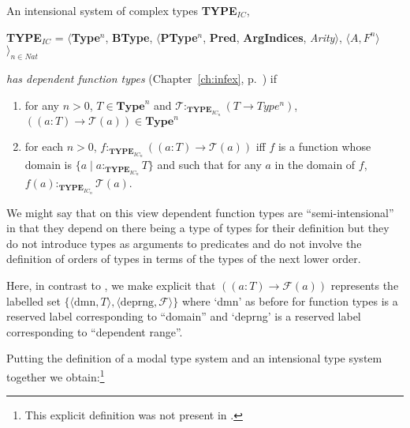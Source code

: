 \label{pg:dep-fn-types}An intensional system of complex types \textbf{TYPE}$_\mathit{IC}$,
\begin{display}
{\bf TYPE$_\mathit{IC}$} = $\langle${\bf Type}$^n$, {\bf BType},
$\langle$\textbf{PType}$^n$, {\bf Pred}, \textbf{ArgIndices}, {\it
  Arity\/}$\rangle$, $\langle A,F^n\rangle$$\rangle_{n\in\mathit{Nat}}$
\end{display} 
\textit{has dependent function types} (Chapter~\ref{ch:infex},
p.~\pageref{ex:dep-fun-types}) if
\begin{enumerate} 
 
\item for any $n>0$, $T \in \mathbf{Type}^n$ and
  $\mathcal{T}:_{\mathbf{TYPE}_{\mathit{IC}_n}}(T\rightarrow\mathit{Type^n})$,
  $((a:T)\rightarrow \mathcal{T}(a)) \in \mathbf{Type}^n$ 
 
\item for each $n>0$,
$f:_{\mathbf{TYPE}_{\mathit{IC}_n}}((a:T)\rightarrow \mathcal{T}(a))$
iff $f$ is a function whose domain is $\{a\mid
a:_{\mathbf{TYPE}_{\mathit{IC}_n}}T\}$ and such that for any $a$ in the
domain of $f$, $f(a):_{\mathbf{TYPE}_{\mathit{IC}_n}}\mathcal{T}(a)$.
   
 
\end{enumerate} 
We might say that on this view dependent function types are
``semi-intensional'' in that they depend on there being a type of
types for their definition but they do not introduce types as
arguments to predicates and do not involve the definition of orders of
types in terms of the types of the next lower order.

Here, in contrast to \cite{Cooper2012}, we make explicit that
$((a:T)\rightarrow \mathcal{F}(a))$ represents the labelled set
$\{\langle\mathrm{dmn},T\rangle,\langle\mathrm{deprng},\mathcal{F}\rangle\}$
where `dmn' as before for function types is a reserved label
corresponding to ``domain'' and `deprng' is a reserved label
corresponding to ``dependent range''.

Putting the definition of a modal type system and an intensional type
system together we obtain:\footnote{This explicit definition was not
  present in \cite{Cooper2012}.}

